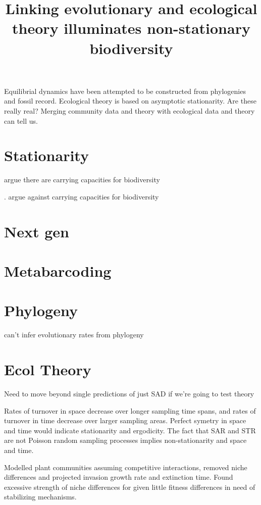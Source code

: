 \documentclass[12pt]{article}
\title{Linking evolutionary and ecological theory illuminates
  non-stationary biodiversity}
\date{}
\begin{document}
\maketitle

Equilibrial dynamics have been attempted to be constructed from
phylogenies and fossil record.  Ecological theory is based on
asymptotic stationarity.  Are these really real?  Merging community
data and theory with ecological data and theory can tell us.

\section{Stationarity}

\cite{rabosky2015amNat} argue there are carrying capacities for biodiversity

\cite{harmon2015amNat}. argue against carrying capacities for
biodiversity


\section{Next gen}

\cite{nielsen2005}
\cite{nei2010}

\section{Metabarcoding}
\citep{gibson2014}

\section{Phylogeny}

\cite{quental2010} can't infer evolutionary rates from phylogeny

\section{Ecol Theory}

\cite{McGill2017} Need to move beyond single predictions of just SAD
if we're going to test theory

\cite{Adler2005} Rates of turnover in space decrease over longer
sampling time spans, and rates of turnover in time decrease over
larger sampling areas.  Perfect symetry in space and time would
indicate stationarity and ergodicity.  The fact that SAR and STR are
not Poisson random sampling processes implies non-stationarity and
space and time.

\cite{Adler2010} Modelled plant communities assuming competitive
interactions, removed niche differences and projected invasion growth
rate and extinction time. Found excessive strength of niche
differences for given little fitness differences in need of
stabilizing mechanisms.
\end{document}
